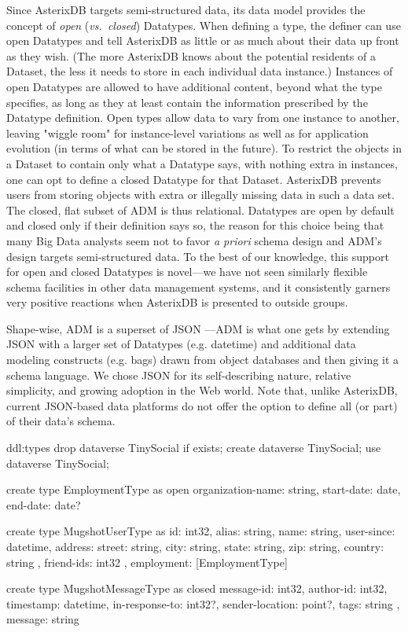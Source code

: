 Since AsterixDB targets semi-structured data, its data model provides the concept of \emph{open} (\emph{vs.~closed}) Datatypes.
When defining a type, the definer can use open Datatypes and tell AsterixDB as little or as much about their data up front as they wish.  
(The more AsterixDB knows about the potential residents of a Dataset, the less it needs to store in each individual data instance.)  
Instances of open Datatypes are allowed to have additional content, beyond what the type specifies, as long as they at least contain the information prescribed by the Datatype definition.  
Open types allow data to vary from one instance to another, leaving "wiggle room" for instance-level variations as well as for application evolution (in terms of what can be stored in the future). 
To restrict the objects in a Dataset to contain only what a Datatype says, with nothing extra in instances, one can opt to define a closed Datatype for that Dataset.
AsterixDB prevents users from storing objects with extra or illegally missing data in such a data set.
The closed, flat subset of ADM is thus relational.
Datatypes are open by default and closed only if their definition says so, the reason for this choice being that many Big Data analysts seem not to favor \emph{a priori} schema design and ADM's design targets semi-structured data.
To the best of our knowledge, this support for open and closed Datatypes is novel---we have not seen similarly flexible schema facilities in other data management systems, and it consistently garners very positive reactions when AsterixDB is presented to outside groups.

Shape-wise, ADM is a superset of JSON \cite{json}---ADM is what one gets by extending JSON with a larger set of Datatypes (e.g. datetime) and additional data modeling constructs (e.g. bags) drawn from object databases and then giving it a schema language.
We chose JSON for its self-describing nature, relative simplicity, and growing adoption in the Web world.
Note that, unlike AsterixDB, current JSON-based data platforms do not offer the option to define all (or part) of their data's schema.

\begin{ddl}{ddl:types}
drop dataverse TinySocial if exists;
create dataverse TinySocial;
use dataverse TinySocial;

create type EmploymentType as open {
    organization-name: string,
    start-date: date,
    end-date: date?
}

create type MugshotUserType as {
    id: int32,
    alias: string,
    name: string,
    user-since: datetime,
    address: {
        street: string,
        city: string,
        state: string,
        zip: string,
        country: string
    },
    friend-ids: {{ int32 }},
    employment: [EmploymentType]
}

create type MugshotMessageType as closed {
    message-id: int32,
    author-id: int32,
    timestamp: datetime,
    in-response-to: int32?,
    sender-location: point?,
    tags: {{ string }},
    message: string
}
\end{ddl}

